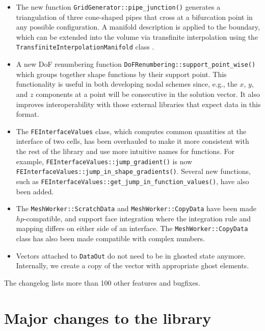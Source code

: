 \documentclass{ansarticle-preprint}
\begin{document}
\begin{itemize}
\item The new function
  \texttt{GridGenerator::pipe\_junction()}
  generates a triangulation of three cone-shaped pipes that cross at a bifurcation point in any possible configuration.
  A manifold description is applied to the boundary, which can be extended into the volume via transfinite interpolation \cite{Gordon82} using the \texttt{TransfiniteInterpolationManifold} class \cite{dealII90}.
  \item A new DoF renumbering function \texttt{DoFRenumbering::support\_point\_wise()} which groups together
  shape functions by their support point. This functionality is useful in both developing nodal schemes since, e.g., the $x$, $y$, and $z$
  components at a point will be consecutive in the solution vector. It
  also improves interoperability with those external libraries that expect
  data in this format.
  \item The \texttt{FEInterfaceValues} class, which computes common quantities at the interface of two cells, has been overhauled to make it
  more consistent with the rest of the library and use more intuitive names for functions. For example,
  \texttt{FEInterfaceValues::jump\_gradient()} is now \texttt{FEInterfaceValues::jump\_in\_shape\_gradients()}. Several new
  functions, such as \texttt{FEInterfaceValues::get\_jump\_in\_function\_values()}, have also been added.
  \item The \texttt{MeshWorker::ScratchData} and \texttt{MeshWorker::CopyData} have been made $hp$-compatible,
  and support face integration where the integration rule and mapping differs on either side of an interface.
  The \texttt{MeshWorker::CopyData} class has also been made compatible with complex numbers.
  \item Vectors attached to \texttt{DataOut} do not need to be in
    ghosted state anymore. Internally, we create a copy of the vector
    with appropriate ghost elements.
\end{itemize}
%
The changelog lists more than 100 other features and bugfixes.




\section{Major changes to the library}
\label{sec:major}
\end{document}
